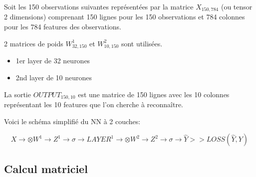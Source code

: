 Soit les 150 observations suivantes représentées par la matrice $X_{150,784}$ (ou tensor 2 dimensions) comprenant 150 lignes pour les 150 observations et 784 colonnes pour les 784 features des observations.

2 matrices de poids $W^1_{32,150}$ et $W^2_{10,150}$ sont utilisées.

\begin{itemize}
	\item 1er layer de 32 neurones
	\item 2nd layer de 10 neurones
\end{itemize}

La sortie $OUTPUT_{150,10}$ est une matrice de 150 lignes avec les 10 colonnes représentant 
les 10 features que l'on cherche à reconnaître.

Voici le schéma simplifié du NN à 2 couches:

$$
X \longrightarrow \otimes W^1 \rightarrow  Z^1 \rightarrow \sigma \rightarrow LAYER^1 \longrightarrow
\otimes W^2 
\rightarrow Z^2 
\rightarrow 
\sigma 
\rightarrow \hat{Y} 
>> LOSS(\hat{Y}, Y)
$$

\subsection{Calcul matriciel}

